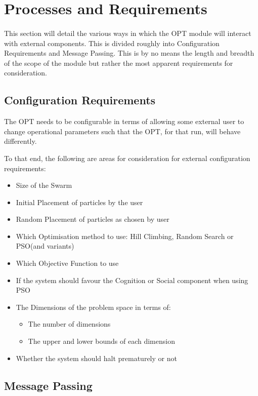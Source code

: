 \documentclass[11pt]{article}
\begin{document}
\section{Processes and Requirements}
\paragraph{}
This section will detail the various ways in which the OPT module will interact with external components. This is divided roughly into Configuration Requirements and Message Passing. This is by no means the length and breadth of the scope of the module but rather the most apparent requirements for consideration.

\subsection{Configuration Requirements}
The OPT needs to be configurable in terms of allowing some external user to change operational parameters such that the OPT, for that run, will behave differently.

To that end, the following are areas for consideration for external configuration requirements:

\begin{itemize}
\item Size of the Swarm
\item Initial Placement of particles by the user
\item Random Placement of particles as chosen by user
\item Which Optimisation method to use: Hill Climbing, Random Search or PSO(and variants)
\item Which Objective Function to use
\item If the system should favour the Cognition or Social component when using PSO
\item The Dimensions of the problem space in terms of:
	\begin{itemize}
	\item The number of dimensions
	\item The upper and lower bounds of each dimension
	\end{itemize}
\item Whether the system should halt prematurely or not	
\end{itemize}

\subsection{Message Passing}
\end{document}
